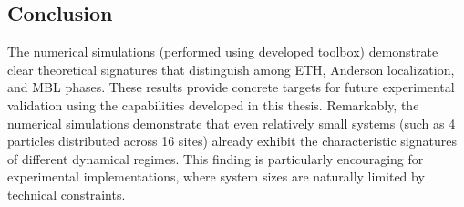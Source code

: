 



\subsection{Conclusion}

The numerical simulations (performed using developed toolbox) demonstrate clear theoretical signatures that distinguish among ETH, Anderson localization, and MBL phases. These results provide concrete targets for future experimental validation using the capabilities developed in this thesis. Remarkably, the numerical simulations demonstrate that even relatively small systems (such as 4 particles distributed across 16 sites) already exhibit the characteristic signatures of different dynamical regimes. This finding is particularly encouraging for experimental implementations, where system sizes are naturally limited by technical constraints.

